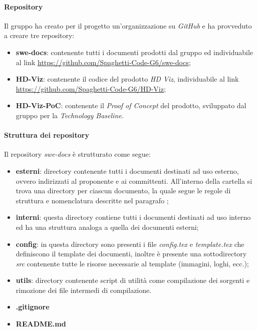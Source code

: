 \paragraph{Repository}
\label{par:repo}

Il gruppo ha creato per il progetto un'organizzazione su \emph{GitHub} e ha provveduto a creare tre repository:
\begin{itemize}
    \item \textbf{swe-docs}: contenente tutti i documenti prodotti dal gruppo ed individuabile al link
    	\url{https://github.com/Spaghetti-Code-G6/swe-docs};
    \item \textbf{HD-Viz}: contenente il codice del prodotto \emph{HD Viz}, individuabile al link \url{https://github.com/Spaghetti-Code-G6/HD-Viz};
    \item \textbf{HD-Viz-PoC}: contenente il \emph{Proof of Concept} del prodotto, sviluppato dal gruppo per la \emph{Technology Baseline}.
\end{itemize}

\paragraph{Struttura dei repository}
\label{par:struttura_repo}

Il repository \emph{swe-docs} è strutturato come segue:
\begin{itemize}
    \item \textbf{esterni}: directory contenente tutti i documenti destinati ad uso esterno, ovvero
		indirizzati al proponente e ai committenti. All'interno della cartella si trova una directory per ciascun documento, la quale
		segue le regole di struttura e nomenclatura descritte nel paragrafo ;
    \item \textbf{interni}: questa directory contiene tutti i documenti destinati ad uso interno ed ha una struttura analoga a quella dei
    	documenti esterni;
    \item \textbf{config}: in questa directory sono presenti i file \emph{config.tex} e \emph{template.tex}
    	che definiscono il template dei documenti, inoltre è presente una sottodirectory \emph{src} contenente tutte le risorse necessarie
    	al template (immagini, loghi, ecc.);
    \item \textbf{utils}: directory contenente script di utilità come compilazione dei sorgenti e rimozione dei file intermedi di
    	compilazione.
    \item \textbf{.gitignore}
    \item \textbf{README.md}
\end{itemize}

